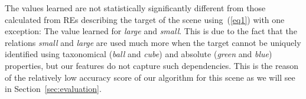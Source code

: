 The values learned are not statistically significantly different from those  calculated from REs describing the target of the scene using~(\ref{eq1}) with one exception: The value learned for \emph{large} and \emph{small}. This is due to the fact that the relations \emph{small} and \emph{large} are used much more when the target cannot be uniquely identified using taxonomical (\emph{ball} and \emph{cube}) and absolute (\emph{green} and \emph{blue}) properties, but our features do not capture such dependencies. This is the reason of the relatively low accuracy score of our algorithm for this scene as we will see in Section~\ref{sec:evaluation}. 
%

